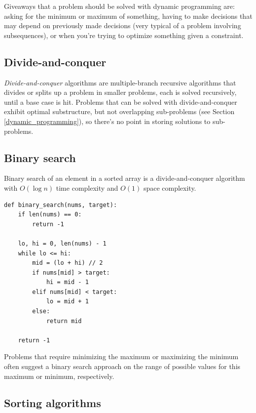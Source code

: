 \documentclass[table, xcdraw]{article}%
\begin{document}
Giveaways that a problem should be solved with dynamic programming are: asking for the minimum or maximum of something, having to make decisions that may depend on previously made decisions (very typical of a problem involving subsequences), or when you’re trying to optimize something given a constraint.

\subsection{Divide-and-conquer}

\emph{Divide-and-conquer} algorithms are multiple-branch recursive algorithms that divides or splits up a problem in smaller problems, each is solved recursively, until a base case is hit. Problems that can be solved with divide-and-conquer exhibit optimal substructure, but not overlapping sub-problems (see Section \ref{dynamic_programming}), so there's no point in storing solutions to sub-problems.

\subsection{Binary search} \label{binary_search}

Binary search of an element in a sorted array is a divide-and-conquer algorithm with $O(\log n)$ time complexity and $O(1)$ space complexity.

\begin{verbatim}
def binary_search(nums, target):
    if len(nums) == 0:
    	return -1
    
    lo, hi = 0, len(nums) - 1
    while lo <= hi:
    	mid = (lo + hi) // 2
    	if nums[mid] > target:
    		hi = mid - 1
    	elif nums[mid] < target:
    		lo = mid + 1
    	else:
    		return mid
    
    return -1
\end{verbatim}

Problems that require minimizing the maximum or maximizing the minimum often suggest a binary search approach on the range of possible values for this maximum or minimum, respectively.

\subsection{Sorting algorithms}
\end{document}
